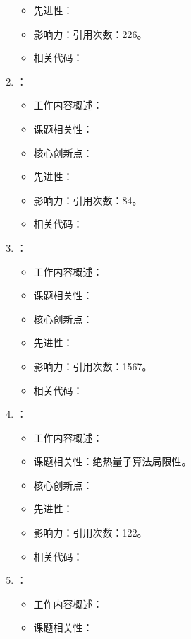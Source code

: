 \begin{enumerate}
\begin{itemize}
                \item 先进性：
                \item 影响力：引用次数：226。
                \item 相关代码：
            \end{itemize}
            \item \citet{farhi2011quantum}：
            \begin{itemize}
                \item 工作内容概述：
                \item 课题相关性：
                \item 核心创新点：
                \item 先进性：
                \item 影响力：引用次数：84。
                \item 相关代码：
            \end{itemize}
            \item \citet{johnson2011quantum}：
            \begin{itemize}
                \item 工作内容概述：
                \item 课题相关性：
                \item 核心创新点：
                \item 先进性：
                \item 影响力：引用次数：1567。
                \item 相关代码：
            \end{itemize}
            \item \citet{farhi2012performance}：
            \begin{itemize}
                \item 工作内容概述：
                \item 课题相关性：绝热量子算法局限性。
                \item 核心创新点：
                \item 先进性：
                \item 影响力：引用次数：122。
                \item 相关代码：
            \end{itemize}
            \item \citet{elgart2012note}：
            \begin{itemize}
                \item 工作内容概述：
                \item 课题相关性：

\end{itemize}
\end{enumerate}
